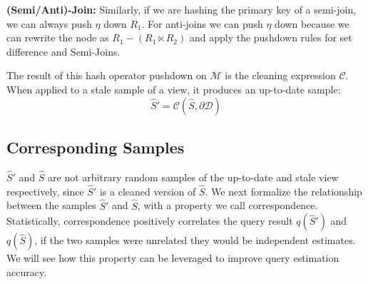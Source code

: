 
\vspace{.25em}

{\noindent \textbf{(Semi/Anti)-Join:}} Similarly, if we are hashing the primary key of a semi-join, we can always push $\eta$ down $R_1$. For anti-joins we can push $\eta$ down because we can rewrite the node as $R_1 - (R_1 \ltimes R_2) $ and apply the pushdown rules for set difference and Semi-Joins.

The result of this hash operator pushdown on $\mathcal{M}$ is the cleaning expression $\mathcal{C}$. 
When applied to a stale sample of a view, it produces an up-to-date sample:
\[
\widehat{S}' = \mathcal{C}(\widehat{S},\partial \mathcal{D})
\]

\subsection{Corresponding Samples}
$\widehat{S}'$ and $\widehat{S}$ are not arbitrary random samples of the up-to-date and stale view respectively, since $\widehat{S}'$ is a cleaned version of $\widehat{S}$.
We next formalize the relationship between the samples $\widehat{S}'$ and $\widehat{S}$, with a property we call correspondence.
Statistically, correspondence positively correlates the query result $q(\widehat{S}')$ and $q(\widehat{S})$, if the two samples were unrelated they would be independent estimates. 
We will see how this property can be leveraged to improve query estimation accuracy.

